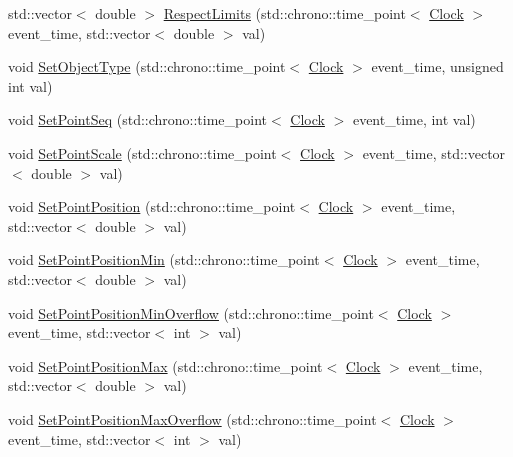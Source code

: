 \begin{DoxyCompactItemize}
std\+::vector$<$ double $>$ \mbox{\hyperlink{classPoint_ac3e94cb7e2ab1d6008ff1d5df00641c2}{Respect\+Limits}} (std\+::chrono\+::time\+\_\+point$<$ \mbox{\hyperlink{universe_8h_a0ef8d951d1ca5ab3cfaf7ab4c7a6fd80}{Clock}} $>$ event\+\_\+time, std\+::vector$<$ double $>$ val)
\item 
void \mbox{\hyperlink{classPoint_a3afeb2d7a2e2b7d9406a57fefa1af2ee}{Set\+Object\+Type}} (std\+::chrono\+::time\+\_\+point$<$ \mbox{\hyperlink{universe_8h_a0ef8d951d1ca5ab3cfaf7ab4c7a6fd80}{Clock}} $>$ event\+\_\+time, unsigned int val)
\item 
void \mbox{\hyperlink{classPoint_a912aefb007184f73b86c37257a415237}{Set\+Point\+Seq}} (std\+::chrono\+::time\+\_\+point$<$ \mbox{\hyperlink{universe_8h_a0ef8d951d1ca5ab3cfaf7ab4c7a6fd80}{Clock}} $>$ event\+\_\+time, int val)
\item 
void \mbox{\hyperlink{classPoint_a8fc02455a773624df80933403b0e545f}{Set\+Point\+Scale}} (std\+::chrono\+::time\+\_\+point$<$ \mbox{\hyperlink{universe_8h_a0ef8d951d1ca5ab3cfaf7ab4c7a6fd80}{Clock}} $>$ event\+\_\+time, std\+::vector$<$ double $>$ val)
\item 
void \mbox{\hyperlink{classPoint_a9191f97ece64b8385140d5f800a3a4ca}{Set\+Point\+Position}} (std\+::chrono\+::time\+\_\+point$<$ \mbox{\hyperlink{universe_8h_a0ef8d951d1ca5ab3cfaf7ab4c7a6fd80}{Clock}} $>$ event\+\_\+time, std\+::vector$<$ double $>$ val)
\item 
void \mbox{\hyperlink{classPoint_ad47980a6ed515a2def172d757af46f1a}{Set\+Point\+Position\+Min}} (std\+::chrono\+::time\+\_\+point$<$ \mbox{\hyperlink{universe_8h_a0ef8d951d1ca5ab3cfaf7ab4c7a6fd80}{Clock}} $>$ event\+\_\+time, std\+::vector$<$ double $>$ val)
\item 
void \mbox{\hyperlink{classPoint_ab0c0a837abb8bd52a59f82723a31f61f}{Set\+Point\+Position\+Min\+Overflow}} (std\+::chrono\+::time\+\_\+point$<$ \mbox{\hyperlink{universe_8h_a0ef8d951d1ca5ab3cfaf7ab4c7a6fd80}{Clock}} $>$ event\+\_\+time, std\+::vector$<$ int $>$ val)
\item 
void \mbox{\hyperlink{classPoint_adb2897b1a7bde15e81b72cb59342f186}{Set\+Point\+Position\+Max}} (std\+::chrono\+::time\+\_\+point$<$ \mbox{\hyperlink{universe_8h_a0ef8d951d1ca5ab3cfaf7ab4c7a6fd80}{Clock}} $>$ event\+\_\+time, std\+::vector$<$ double $>$ val)
\item 
void \mbox{\hyperlink{classPoint_a29aca71cae82195775f3822740df80ec}{Set\+Point\+Position\+Max\+Overflow}} (std\+::chrono\+::time\+\_\+point$<$ \mbox{\hyperlink{universe_8h_a0ef8d951d1ca5ab3cfaf7ab4c7a6fd80}{Clock}} $>$ event\+\_\+time, std\+::vector$<$ int $>$ val)

\end{DoxyCompactItemize}
